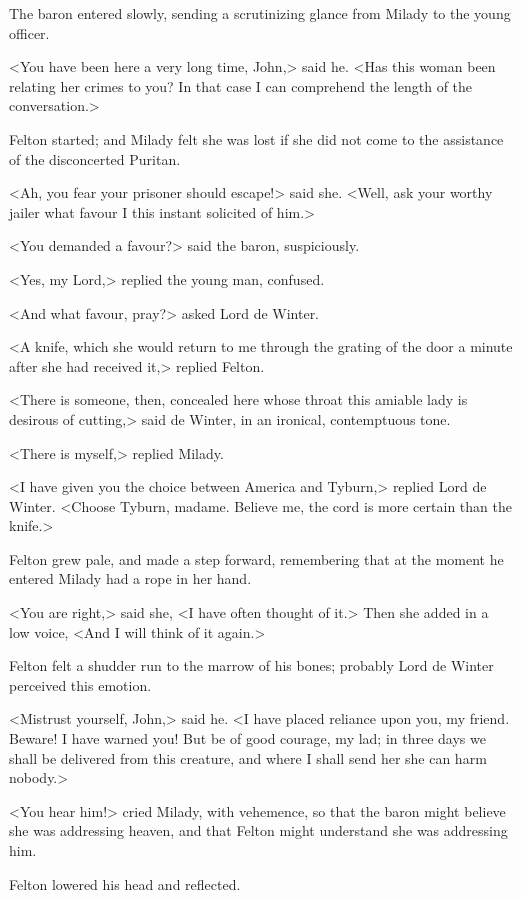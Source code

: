The baron entered slowly, sending a scrutinizing glance from Milady to the young officer. 

<You have been here a very long time, John,> said he. <Has this woman been relating her crimes to you? In that case I can comprehend the length of the conversation.> 

Felton started; and Milady felt she was lost if she did not come to the assistance of the disconcerted Puritan. 

<Ah, you fear your prisoner should escape!> said she. <Well, ask your worthy jailer what favour I this instant solicited of him.> 

<You demanded a favour?> said the baron, suspiciously. 

<Yes, my Lord,> replied the young man, confused. 

<And what favour, pray?> asked Lord de Winter. 

<A knife, which she would return to me through the grating of the door a minute after she had received it,> replied Felton. 

<There is someone, then, concealed here whose throat this amiable lady is desirous of cutting,> said de Winter, in an ironical, contemptuous tone. 

<There is myself,> replied Milady. 

<I have given you the choice between America and Tyburn,> replied Lord de Winter. <Choose Tyburn, madame. Believe me, the cord is more certain than the knife.> 

Felton grew pale, and made a step forward, remembering that at the moment he entered Milady had a rope in her hand. 

<You are right,> said she, <I have often thought of it.> Then she added in a low voice, <And I will think of it again.> 

Felton felt a shudder run to the marrow of his bones; probably Lord de Winter perceived this emotion. 

<Mistrust yourself, John,> said he. <I have placed reliance upon you, my friend. Beware! I have warned you! But be of good courage, my lad; in three days we shall be delivered from this creature, and where I shall send her she can harm nobody.> 

<You hear him!> cried Milady, with vehemence, so that the baron might believe she was addressing heaven, and that Felton might understand she was addressing him. 

Felton lowered his head and reflected. 

